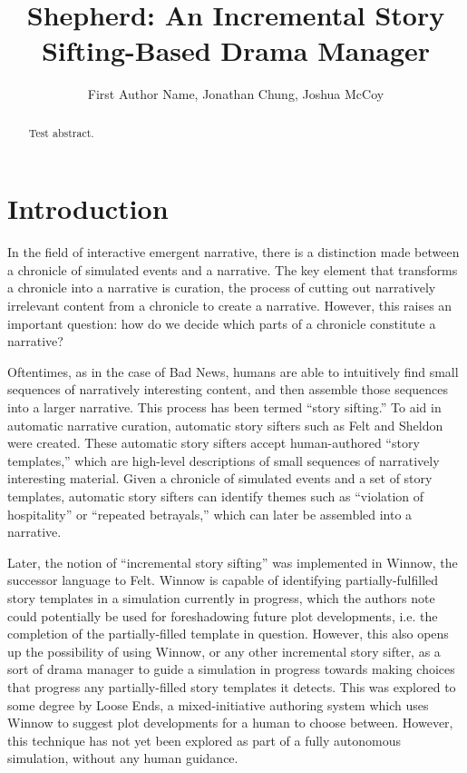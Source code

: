 \documentclass[letterpaper]{article}
\title{Shepherd: An Incremental Story Sifting-Based Drama Manager}
\author {
    First Author Name,
    Jonathan Chung,
    Joshua McCoy
}
\begin{document}
\maketitle

\begin{abstract}
    Test abstract.
\end{abstract}

\section{Introduction}
In the field of interactive emergent narrative, there is a distinction made between a
chronicle of simulated events and a narrative. The key element that transforms a chronicle
into a narrative is curation, the process of cutting out narratively irrelevant content
from a chronicle to create a narrative. However, this raises an important question: how do
we decide which parts of a chronicle constitute a narrative?

Oftentimes, as in the case of Bad News, humans are able to intuitively find small
sequences of narratively interesting content, and then assemble those sequences into a
larger narrative. This process has been termed “story sifting.” To aid in automatic
narrative curation, automatic story sifters such as Felt and Sheldon were created. These
automatic story sifters accept human-authored “story templates,” which are high-level
descriptions of small sequences of narratively interesting material. Given a chronicle of
simulated events and a set of story templates, automatic story sifters can identify themes
such as “violation of hospitality” or “repeated betrayals,” which can later be assembled
into a narrative. 

Later, the notion of “incremental story sifting” was implemented in Winnow, the successor
language to Felt. Winnow is capable of identifying partially-fulfilled story templates in
a simulation currently in progress, which the authors note could potentially be used for
foreshadowing future plot developments, i.e. the completion of the partially-filled
template in question. However, this also opens up the possibility of using Winnow, or any
other incremental story sifter, as a sort of drama manager to guide a simulation in
progress towards making choices that progress any partially-filled story templates it
detects. This was explored to some degree by Loose Ends, a mixed-initiative authoring
system which uses Winnow to suggest plot developments for a human to choose between.
However, this technique has not yet been explored as part of a fully autonomous
simulation, without any human guidance. 
\end{document}
